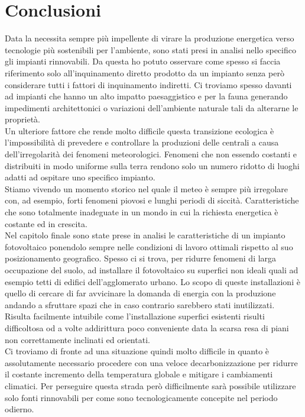 \chapter{Conclusioni}
\label{chp:Conclusioni}
Data la necessita sempre più impellente di virare la produzione energetica verso tecnologie più sostenibili per l'ambiente, sono stati presi in analisi nello specifico gli impianti rinnovabili. Da questa ho potuto osservare come spesso si faccia riferimento solo all'inquinamento diretto prodotto da un impianto senza però considerare tutti i fattori di inquinamento indiretti.
Ci troviamo spesso davanti ad impianti che hanno un alto impatto paesaggistico e per la fauna generando impedimenti architettonici o variazioni dell'ambiente naturale tali da alterarne le proprietà.\\
Un ulteriore fattore che rende molto difficile questa transizione ecologica è l'impossibilità di prevedere e controllare la produzioni delle centrali a causa dell'irregolarità dei fenomeni meteorologici. Fenomeni che non essendo costanti e distribuiti in modo uniforme sulla terra rendono solo un numero ridotto di luoghi adatti ad ospitare uno specifico impianto.\\
Stiamo vivendo un momento storico nel quale il meteo è sempre più irregolare con, ad esempio, forti fenomeni piovosi e lunghi periodi di siccità. Caratteristiche che sono totalmente inadeguate in un mondo in cui la richiesta energetica è costante ed in crescita.\\
Nel capitolo finale sono state prese in analisi le caratteristiche di un impianto fotovoltaico ponendolo sempre nelle condizioni di lavoro ottimali rispetto al suo posizionamento geografico. Spesso ci si trova, per ridurre fenomeni di larga occupazione del suolo, ad installare il fotovoltaico su superfici non ideali quali ad esempio tetti di edifici dell'agglomerato urbano.
Lo scopo di queste installazioni è quello di cercare di far avvicinare la domanda di energia con la produzione andando a sfruttare spazi che in caso contrario sarebbero stati inutilizzati. Risulta facilmente intuibile come l'installazione superfici esistenti risulti difficoltosa od a volte addirittura poco conveniente data la scarsa resa di piani non correttamente inclinati ed orientati.\\
Ci troviamo di fronte ad una situazione quindi molto difficile in quanto è assolutamente necessario procedere con una veloce decarbonizzazione per ridurre il costante incremento della temperatura globale e mitigare i cambiamenti climatici. Per perseguire questa strada però difficilmente sarà possibile utilizzare solo fonti rinnovabili per come sono tecnologicamente concepite nel periodo odierno.